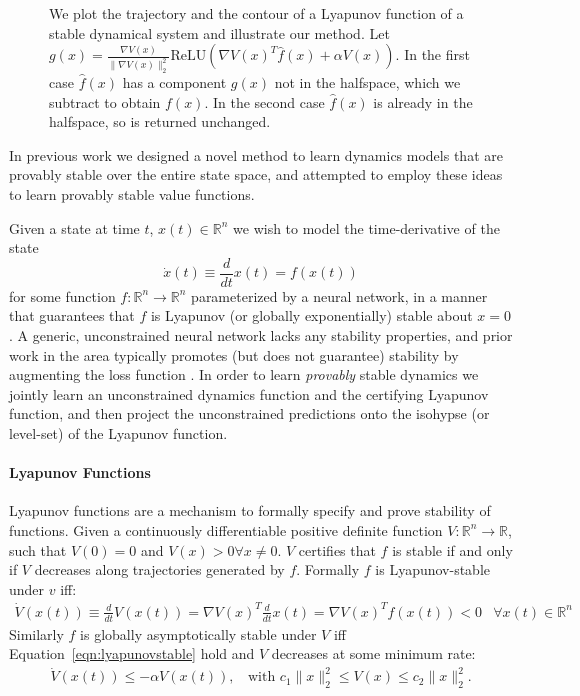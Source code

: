 \documentclass[11pt]{article}
\begin{document}
\begin{figure}
  
  \caption{We plot the trajectory and the contour of a Lyapunov function of a stable dynamical system and illustrate our method. Let $g( x) = \frac{\nabla V(x)}{\|\nabla V(x)\|_2^2} \mathrm{ReLU}\left(\nabla V(x)^T \hat{f}(x) + \alpha V (x)\right)$. In the first case $\hat f( x)$ has a component $g( x)$ not in the halfspace, which we subtract to obtain $f( x)$. In the second case $\hat f( x)$ is already in the halfspace, so is returned unchanged.}
  \label{fig:stable_nn_construction}
\end{figure}

In previous work \cite{manek2019stable} we designed a novel method to learn dynamics models that are provably stable over the entire state space, and attempted to employ these ideas to learn provably stable value functions.

Given a state at time $t$, $x(t) \in \mathbb{R}^n$ we wish to model the time-derivative of the state
\begin{equation}
\dot{x}(t) \equiv \frac{d}{dt}x(t) = f(x(t))
\end{equation}
for some function $f : \mathbb{R}^n \rightarrow \mathbb{R}^n$ parameterized by a neural network, in a manner that guarantees that $f$ is Lyapunov (or globally exponentially) stable about $x=0$. A generic, unconstrained neural network lacks any stability properties, and prior work in the area typically promotes (but does not guarantee) stability by augmenting the loss function \citep{chow2018lyapunov,richards2018lyapunov,taylor2019episodic}. In order to learn \emph{provably} stable dynamics we jointly learn an unconstrained dynamics function and the certifying Lyapunov function, and then project the unconstrained predictions onto the isohypse (or level-set) of the Lyapunov function.

\paragraph{Lyapunov Functions }
Lyapunov functions \citep{khalil2002nonlinear,la2012stability} are a mechanism to formally specify and prove stability of functions. Given a continuously differentiable positive definite function $V : \mathbb{R}^n \rightarrow \mathbb{R}$, such that $V(0) = 0$ and $V(x) > 0 \forall x \neq 0$. $V$ certifies that $f$ is stable if and only if $V$ decreases along trajectories generated by $f$. Formally $f$ is Lyapunov-stable under $v$ iff:
\begin{align}
    \dot{V}(x(t)) \equiv \frac{d}{dt}V(x(t)) = \nabla V(x)^T \frac{d}{dt} x(t) = \nabla V(x)^T f(x(t)) < 0 & \forall x(t) \in \mathbb{R}^n \label{eqn:lyapunovstable}
\end{align}
Similarly $f$ is globally asymptotically stable under $V$ iff Equation~\ref{eqn:lyapunovstable} hold and $V$ decreases at some minimum rate:
\begin{align}
    \dot{V}(x(t)) \leq -\alpha V(x(t)), \;\; \mbox{ with } c_1 \|x\|_2^2 \leq V(x) \leq c_2 \|x\|_2^2. \label{eqn:req_for_GAS}
\end{align}
\end{document}

